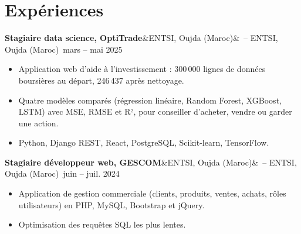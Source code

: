 \documentclass[10pt]{article}
\newcommand{\entree}[3]{\par\noindent\textbf{#1}\ifx&#2&\else\ {\color{gris}-- #2}\fi\ \hfill{\color{gris}#3}\par\vspace{1pt}}
\begin{document}
\section*{Expériences}
\entree{Stagiaire data science, OptiTrade}{ENTSI, Oujda (Maroc)}{mars -- mai 2025}
\begin{itemize}
  \item Application web d'aide à l'investissement : 300\,000 lignes de données boursières au départ, 246\,437 après nettoyage.
  \item Quatre modèles comparés (régression linéaire, Random Forest, XGBoost, LSTM) avec MSE, RMSE et R², pour conseiller d'acheter, vendre ou garder une action.
  \item Python, Django REST, React, PostgreSQL, Scikit-learn, TensorFlow.
\end{itemize}
\vspace{3pt}
\entree{Stagiaire développeur web, GESCOM}{ENTSI, Oujda (Maroc)}{juin -- juil. 2024}
\begin{itemize}
  \item Application de gestion commerciale (clients, produits, ventes, achats, rôles utilisateurs) en PHP, MySQL, Bootstrap et jQuery.
  \item Optimisation des requêtes SQL les plus lentes.
\end{itemize}
\end{document}
